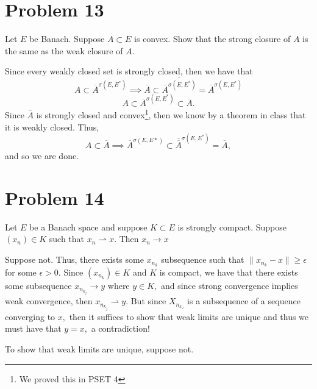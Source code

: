 \documentclass[11pt]{article}
\begin{document}
\newpage
\section*{Problem 13}
\begin{problem}
    Let $E$ be Banach. Suppose $A\subset E$ is convex. Show that the strong closure of $A$ is the same as the weak closure of $A.$
\end{problem}
\begin{solution}
    Since every weakly closed set is strongly closed, then we have that 
    \[A \subset \overline{A}^{\sigma(E, E^*)} \implies \overline{A}\subset \overline{\overline{A}^{\sigma(E, E^*)}} = \overline{A}^{\sigma(E, E^*)}\]
    \[A \subset \overline{A}^{\sigma(E, E^*)}\subset \overline{A}.\] Since $\overline{A}$ is strongly closed and convex\footnote{We proved this in PSET 4}, then we know by a theorem in class that it is weakly closed. Thus, 
    \[A \subset \overline{A} \implies \overline{A}^{\sigma(E, E*)}\subset \overline{\overline{A}}^{\sigma(E, E^*)} = \overline{A},\] and so we are done.
\end{solution}

\newpage
\section*{Problem 14}
\begin{problem}
    Let $E$ be a Banach space and suppose $K\subset E$ is strongly compact. Suppose $(x_n)\in K$ such that $x_n \rightharpoonup x.$ Then $x_n \to x$
\end{problem}
\begin{solution}
    Suppose not. Thus, there exists some $x_{n_k}$ subsequence such that $\|x_{n_k} - x\|\geq \epsilon$ for some $\epsilon>0.$ Since $(x_{n_k}) \in K$ and $K$ is compact, we have that there exists some subsequence $x_{n_{k_j}}\to y$ where $y\in K,$ and since strong convergence implies weak convergence, then $x_{n_{k_j}}\rightharpoonup y.$ But since $X_{n_{k_J}}$ is a subsequence of a sequence converging to $x,$ then it suffices to show that weak limits are unique and thus we must have that $y=x,$ a contradiction!

    To show that weak limits are unique, suppose not.
\end{solution}

\newpage
\end{document}
